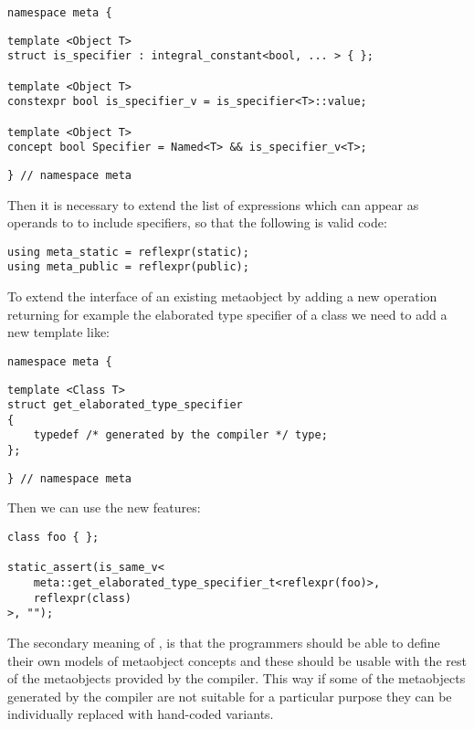 \begin{verbatim}
namespace meta {
\end{verbatim}
\begin{verbatim}
template <Object T>
struct is_specifier : integral_constant<bool, ... > { };

template <Object T>
constexpr bool is_specifier_v = is_specifier<T>::value;

template <Object T>
concept bool Specifier = Named<T> && is_specifier_v<T>;

\end{verbatim}
\begin{verbatim}
} // namespace meta
\end{verbatim}

Then it is necessary to extend the list of expressions which can appear
as operands to \verb@reflexpr@ to include specifiers, so that the following
is valid code:

\begin{verbatim}
using meta_static = reflexpr(static);
using meta_public = reflexpr(public);
\end{verbatim}

To extend the interface of an existing metaobject by adding a new operation
returning for example the elaborated type specifier of a class we need to
add a new template like:

\begin{verbatim}
namespace meta {
\end{verbatim}
\begin{verbatim}
template <Class T>
struct get_elaborated_type_specifier
{
	typedef /* generated by the compiler */ type;
};
\end{verbatim}
\begin{verbatim}
} // namespace meta
\end{verbatim}

Then we can use the new features:

\begin{verbatim}
class foo { };

static_assert(is_same_v<
	meta::get_elaborated_type_specifier_t<reflexpr(foo)>,
	reflexpr(class)
>, "");
\end{verbatim}

The secondary meaning of , is that
the programmers should be able to define their own models of metaobject concepts
and these should be usable with the rest of the metaobjects provided by the
compiler. This way if some of the metaobjects generated by the compiler are not
suitable for a particular purpose they can be individually replaced with
hand-coded variants.


